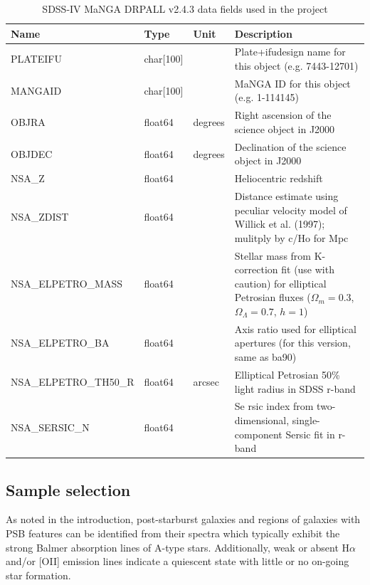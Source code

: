\begin{table}
\caption[MaNGA DRPALL fields used in the project]{SDSS-IV MaNGA DRPALL v2.4.3 data fields used in the project}
\label{tab:DRPall-table}
\begin{tabular}{|p{3.2cm}|p{1.2cm}||p{1cm}|p{9.8cm}|}
\hline
Name & Type & Unit & Description \\
\hline
PLATEIFU & char{[}100{]} &  & Plate+ifudesign name for this object (e.g. 7443-12701)\\
MANGAID & char{[}100{]} & & MaNGA ID for this object (e.g. 1-114145)\\
OBJRA & float64 & degrees & Right ascension of the science object in J2000\\
OBJDEC & float64 & degrees & Declination of the science object in J2000\\
NSA\_Z & float64 &  & Heliocentric redshift\\
NSA\_ZDIST & float64 &  & Distance estimate using peculiar velocity model of Willick et al. (1997); mulitply by c/Ho for Mpc\\
NSA\_ELPETRO\_MASS & float64 &  & Stellar mass from K-correction fit (use with caution) for elliptical Petrosian fluxes ($\Omega_m=0.3$, $\Omega_\Lambda=0.7$, $h=1$)\\
NSA\_ELPETRO\_BA & float64 &  & Axis ratio used for elliptical apertures (for this version, same as ba90)\\
NSA\_ELPETRO\_TH50\_R & float64 & arcsec & Elliptical Petrosian 50\% light radius in SDSS r-band\\
NSA\_SERSIC\_N & float64 &  & Se
rsic index from two-dimensional, single-component Sersic fit in r-band\\
\hline
\end{tabular}
\end{table}

\subsection{Sample selection}
As noted in the introduction, post-starburst galaxies and regions of galaxies with PSB features can be identified from their spectra which typically exhibit the strong Balmer absorption lines of A-type stars. Additionally, weak or absent H$\alpha$ and/or [OII] emission lines indicate a quiescent state with little or no on-going star formation. 

